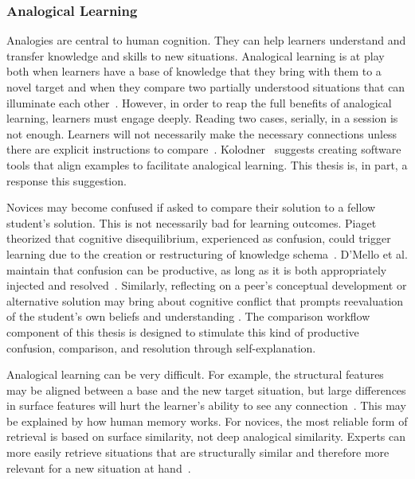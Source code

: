 \subsubsection{Analogical Learning}

Analogies are central to human cognition. They can help learners understand and transfer knowledge and skills to new situations. Analogical learning is at play both when learners have a base of knowledge that they bring with them to a novel target and when they compare two partially understood situations that can illuminate each other~\cite{kurtz01learning,loewenstein2003analogical}. However, in order to reap the full benefits of analogical learning, learners must engage deeply. Reading two cases, serially, in a session is not enough. Learners will not necessarily make the necessary connections unless there are explicit instructions to compare~\cite{loewenstein2003analogical,catrambone1989overcoming}. Kolodner~\cite{Kolodner} suggests creating software tools that align examples to facilitate analogical learning. This thesis is, in part, a response this suggestion.

Novices may become confused if asked to compare their solution to a fellow student's solution. This is not necessarily bad for learning outcomes. Piaget theorized that cognitive disequilibrium, experienced as confusion, could trigger learning due to the creation or restructuring of knowledge schema~\cite{disequilibrium}. D'Mello et al. maintain that confusion can be productive, as long as it is both appropriately injected and resolved~\cite{productiveconfusion}. Similarly, reflecting on a peer's conceptual development or alternative solution may bring about cognitive conflict that prompts reevaluation of the student's own beliefs and understanding \cite{kavanagh}. The comparison workflow component of this thesis is designed to stimulate this kind of productive confusion, comparison, and resolution through self-explanation. 

Analogical learning can be very difficult. For example, the structural features may be aligned between a base and the new target situation, but large differences in surface features will hurt the learner's ability to see any connection~\cite{Kurtz}. This may be explained by how human memory works. For novices, the most reliable form of retrieval is based on surface similarity, not deep analogical similarity. Experts can more easily retrieve situations that are structurally similar and therefore more relevant for a new situation at hand~\cite{Loewenstein}.

